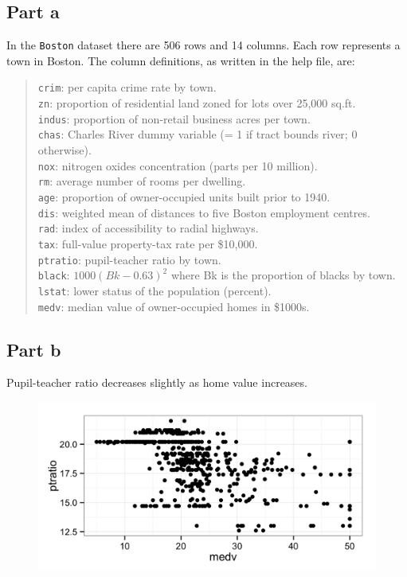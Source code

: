 \documentclass[11pt]{article}
\begin{document}
\subsection*{Part a}

In the \texttt{Boston} dataset there are 506 rows and 14 columns. Each row represents a town in Boston. The column definitions, as written in the help file, are:
\begin{quote}
\texttt{crim}: per capita crime rate by town.\\
\texttt{zn}: proportion of residential land zoned for lots over 25,000 sq.ft.\\
\texttt{indus}: proportion of non-retail business acres per town.\\
\texttt{chas}: Charles River dummy variable (= 1 if tract bounds river; 0 otherwise).\\
\texttt{nox}: nitrogen oxides concentration (parts per 10 million).\\
\texttt{rm}: average number of rooms per dwelling.\\
\texttt{age}: proportion of owner-occupied units built prior to 1940.\\
\texttt{dis}: weighted mean of distances to five Boston employment centres.\\
\texttt{rad}: index of accessibility to radial highways.\\
\texttt{tax}: full-value property-tax rate per \$10,000.\\
\texttt{ptratio}: pupil-teacher ratio by town.\\
\texttt{black}: $1000(Bk - 0.63)^2$ where Bk is the proportion of blacks by town.\\
\texttt{lstat}: lower status of the population (percent).\\
\texttt{medv}: median value of owner-occupied homes in \$1000s.\\
\end{quote}


\subsection*{Part b}

Pupil-teacher ratio decreases slightly as home value increases.
\begin{figure}[H]
	\centering
	\includegraphics[width=5in]{10b_ptratio_vs_medv.png}
\end{figure}
\end{document}
